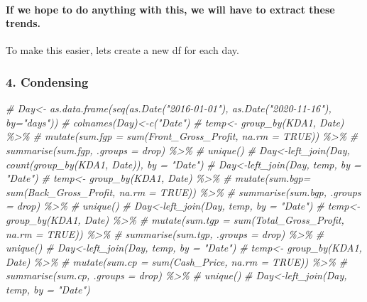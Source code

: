 \documentclass[
]{article}
\newenvironment{Shaded}{\begin{snugshade}}{\end{snugshade}}
\newcommand{\CommentTok}[1]{\textcolor[rgb]{0.56,0.35,0.01}{\textit{#1}}}
\begin{document}
\hypertarget{if-we-hope-to-do-anything-with-this-we-will-have-to-extract-these-trends.}{%
\paragraph{If we hope to do anything with this, we will have to extract
these
trends.}\label{if-we-hope-to-do-anything-with-this-we-will-have-to-extract-these-trends.}}

To make this easier, lets create a new df for each day.

\hypertarget{condensing}{%
\subsubsection{4. Condensing}\label{condensing}}

\begin{Shaded}
\begin{Highlighting}[]
\CommentTok{\# Day\textless{}{-} as.data.frame(seq(as.Date("2016{-}01{-}01"), as.Date("2020{-}11{-}16"), by="days"))}
\CommentTok{\# colnames(Day)\textless{}{-}c("Date")}
\CommentTok{\# temp\textless{}{-} group\_by(KDA1, Date) \%\textgreater{}\%}
\CommentTok{\#   mutate(sum.fgp = sum(Front\_Gross\_Profit, na.rm = TRUE)) \%\textgreater{}\%}
\CommentTok{\#   summarise(sum.fgp, .groups = \textquotesingle{}drop\textquotesingle{}) \%\textgreater{}\%}
\CommentTok{\#   unique()}
\CommentTok{\# Day\textless{}{-}left\_join(Day, count(group\_by(KDA1, Date)), by = "Date")}
\CommentTok{\# Day\textless{}{-}left\_join(Day, temp, by = "Date")}
\CommentTok{\# temp\textless{}{-} group\_by(KDA1, Date) \%\textgreater{}\%}
\CommentTok{\#   mutate(sum.bgp= sum(Back\_Gross\_Profit, na.rm = TRUE)) \%\textgreater{}\%}
\CommentTok{\#   summarise(sum.bgp, .groups = \textquotesingle{}drop\textquotesingle{}) \%\textgreater{}\%}
\CommentTok{\#   unique()}
\CommentTok{\# Day\textless{}{-}left\_join(Day, temp, by = "Date")}
\CommentTok{\# temp\textless{}{-} group\_by(KDA1, Date) \%\textgreater{}\%}
\CommentTok{\#   mutate(sum.tgp = sum(Total\_Gross\_Profit, na.rm = TRUE)) \%\textgreater{}\%}
\CommentTok{\#   summarise(sum.tgp, .groups = \textquotesingle{}drop\textquotesingle{}) \%\textgreater{}\%}
\CommentTok{\#   unique()}
\CommentTok{\# Day\textless{}{-}left\_join(Day, temp, by = "Date")}
\CommentTok{\# temp\textless{}{-} group\_by(KDA1, Date) \%\textgreater{}\%}
\CommentTok{\#   mutate(sum.cp = sum(Cash\_Price, na.rm = TRUE)) \%\textgreater{}\%}
\CommentTok{\#   summarise(sum.cp, .groups = \textquotesingle{}drop\textquotesingle{}) \%\textgreater{}\%}
\CommentTok{\#   unique()}
\CommentTok{\# Day\textless{}{-}left\_join(Day, temp, by = "Date")}
\end{Highlighting}
\end{Shaded}
\end{document}
